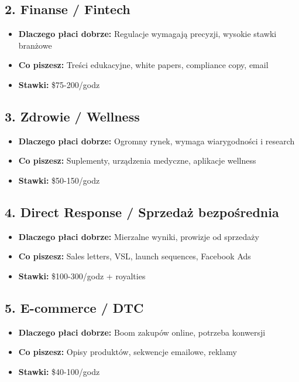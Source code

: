 \documentclass[
  12pt,
  a4paper,
  twoside,
  openright,
  12pt,
  DIV=12,
  BCOR=12mm]{scrbook}
\providecommand{\tightlist}{%
  \setlength{\itemsep}{0pt}\setlength{\parskip}{0pt}}\usepackage{longtable,booktabs,array}
\begin{document}
\subsection{2. Finanse / Fintech}\label{finanse-fintech}

\begin{itemize}
\tightlist
\item
  \textbf{Dlaczego płaci dobrze:} Regulacje wymagają precyzji, wysokie
  stawki branżowe
\item
  \textbf{Co piszesz:} Treści edukacyjne, white papers, compliance copy,
  email
\item
  \textbf{Stawki:} \$75-200/godz
\end{itemize}

\subsection{3. Zdrowie / Wellness}\label{zdrowie-wellness}

\begin{itemize}
\tightlist
\item
  \textbf{Dlaczego płaci dobrze:} Ogromny rynek, wymaga wiarygodności i
  research
\item
  \textbf{Co piszesz:} Suplementy, urządzenia medyczne, aplikacje
  wellness
\item
  \textbf{Stawki:} \$50-150/godz
\end{itemize}

\subsection{4. Direct Response / Sprzedaż
bezpośrednia}\label{direct-response-sprzedaux17c-bezpoux15brednia}

\begin{itemize}
\tightlist
\item
  \textbf{Dlaczego płaci dobrze:} Mierzalne wyniki, prowizje od
  sprzedaży
\item
  \textbf{Co piszesz:} Sales letters, VSL, launch sequences, Facebook
  Ads
\item
  \textbf{Stawki:} \$100-300/godz + royalties
\end{itemize}

\subsection{5. E-commerce / DTC}\label{e-commerce-dtc}

\begin{itemize}
\tightlist
\item
  \textbf{Dlaczego płaci dobrze:} Boom zakupów online, potrzeba
  konwersji
\item
  \textbf{Co piszesz:} Opisy produktów, sekwencje emailowe, reklamy
\item
  \textbf{Stawki:} \$40-100/godz
\end{itemize}
\end{document}
